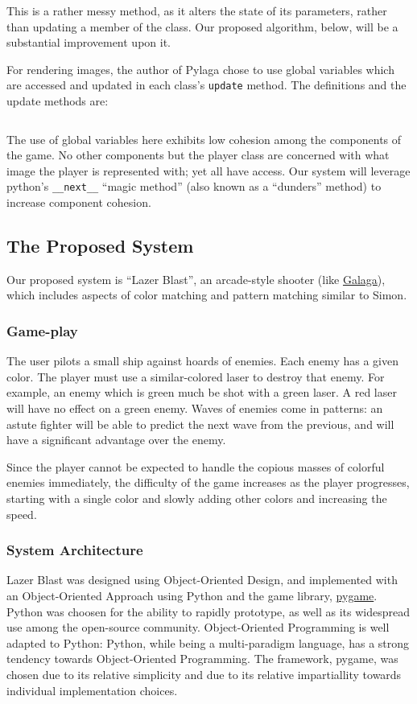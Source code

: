 \inputminted[baselinestretch=1]{python}{../code/pylaga_player.py}

This is a rather messy method, as it alters the state of its parameters,
rather than updating a member of the class.  Our proposed algorithm,
below, will be a substantial improvement upon it.

For rendering images, the author of Pylaga chose to use global variables
which are accessed and updated in each class's \texttt{update}
method.  The definitions and the update methods are:

\inputminted[baselinestretch=1]{python}{../code/pylaga_images_and_update.py}

The use of global variables here exhibits low cohesion among the
components of the game.  No other components but the player class
are concerned with what image the player is represented with; yet
all have access.  Our system will leverage python's \texttt{__next__}
``magic method'' (also known as a ``dunders'' method) to increase component
cohesion.

\subsection*{The Proposed System}
Our proposed system is ``Lazer Blast'', an arcade-style shooter (like
\href{https://en.wikipedia.org/wiki/Galaga}{Galaga}), which includes
aspects of color matching and pattern matching similar to Simon.

\subsubsection*{Game-play}
The user pilots a small ship against hoards of enemies.  Each enemy
has a given color.  The player must use a similar-colored laser to
destroy that enemy.  For example, an enemy which is green much be
shot with a green laser.  A red laser will have no effect on a green enemy.
Waves of enemies come in patterns: an astute fighter will be able to
predict the next wave from the previous, and will have a significant
advantage over the enemy.

Since the player cannot be expected to handle the copious masses
of colorful enemies immediately, the difficulty of the game increases
as the player progresses, starting with a single color and slowly
adding other colors and increasing the speed.

\subsubsection*{System Architecture}
Lazer Blast was designed using Object-Oriented Design, and implemented
with an Object-Oriented Approach using Python and the game library,
\href{http://pygame.org/news}{pygame}.  Python was choosen for the
ability to rapidly prototype, as well as its widespread use among
the open-source community.  Object-Oriented Programming is well
adapted to Python: Python, while being a multi-paradigm language,
has a strong tendency towards Object-Oriented Programming.  The
framework, pygame, was chosen due to its relative simplicity and due
to its relative impartiallity towards individual implementation choices.

